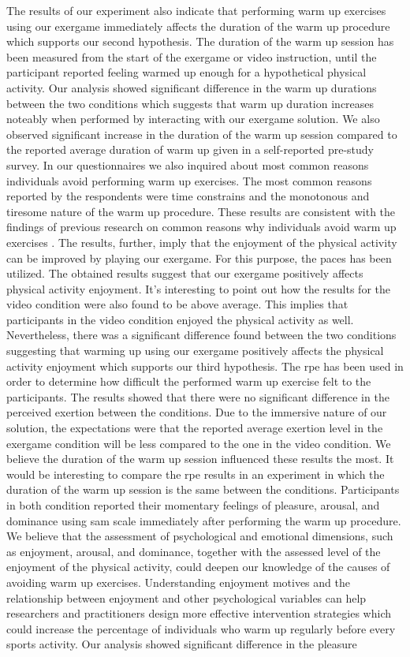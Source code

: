 The results of our experiment also indicate that performing warm up exercises using our exergame immediately affects the duration of the warm up procedure which supports our second hypothesis. The duration of the warm up session has been measured from the start of the exergame or video instruction, until the participant reported feeling warmed up enough for a hypothetical physical activity. Our analysis showed significant difference in the warm up durations between the two conditions which suggests that warm up duration increases noteably when performed by interacting with our exergame solution. We also observed significant increase in the duration of the warm up session compared to the reported average duration of warm up given in a self-reported pre-study survey. In our questionnaires we also inquired about most common reasons individuals avoid performing warm up exercises. The most common reasons reported by the respondents were time constrains and the monotonous and tiresome nature of the warm up procedure. These results are consistent with the findings of previous research on common reasons why individuals avoid warm up exercises \cite{fradkin2010effects}. The results, further, imply that the enjoyment of the physical activity can be improved by playing our exergame. For this purpose, the \acrlong{paces} has been utilized. The obtained results suggest that our exergame positively affects physical activity enjoyment. It's interesting to point out how the results for the video condition were also found to be above average. This implies that participants in the video condition enjoyed the physical activity as well.  Nevertheless, there was a significant difference found between the two conditions suggesting that warming up using our exergame positively affects the physical activity enjoyment which supports our third hypothesis. The \acrfull{rpe} has been used in order to determine how difficult the performed warm up exercise felt to the participants. The results showed that there were no significant difference in the perceived exertion between the conditions. Due to the immersive nature of our solution, the expectations were that the reported average exertion level in the exergame condition will be less compared to the one in the video condition. We believe the duration of the warm up session influenced these results the most. It would be interesting to compare the \acrshort{rpe} results in an experiment in which the duration of the warm up session is the same between the conditions. Participants in both condition reported their momentary feelings of pleasure, arousal, and dominance using  \acrlong{sam} scale immediately after performing the warm up procedure. We believe that the assessment of psychological and emotional dimensions, such as enjoyment, arousal, and dominance, together with the assessed level of the enjoyment of the physical activity, could deepen our knowledge of the causes of avoiding warm up exercises. Understanding enjoyment motives and the relationship between enjoyment and other psychological variables can help researchers and practitioners design more effective intervention strategies which could increase the percentage of individuals who warm up regularly before every sports activity. Our analysis showed significant difference in the pleasure 